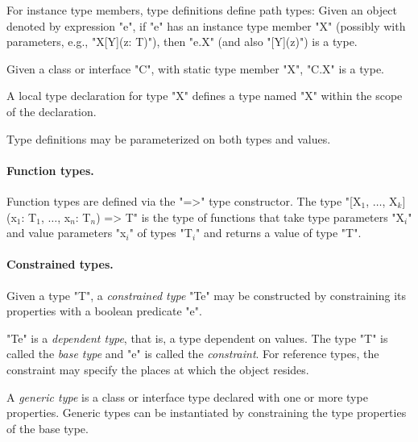 
        For instance type members, type definitions define path
        types: Given an object
        denoted by expression \xcd"e", if \xcd"e" has an
        instance
        type member \xcd"X" (possibly with parameters, e.g.,
        \xcd"X[Y](z: T)"), then \xcd"e.X" (and also \xcd"[Y](z)")
        is a type.

        Given a class or interface \xcd"C", with static type
        member \xcd"X", \xcd"C.X" is a type.

        A local type declaration for type \xcd"X" defines a type
        named \xcd"X" within the scope of the declaration.

        Type definitions may be parameterized on both types and
        values.

\paragraph{Function types.}

        Function types are defined via the \xcd"=>" type
        constructor.  The type
  \xcdmath"[X$_1$, $\dots$, X$_k$](x$_1$: T$_1$, $\dots$, x$_n$: T$_n$) => T"
        is the type of functions that take type parameters
        \xcdmath"X$_i$"
        and value parameters
        \xcdmath"x$_i$"
        of types
        \xcdmath"T$_i$"
        and returns a value of type \xcd"T".

\paragraph{Constrained types.}
        Given a type \xcd"T", a {\em constrained type}
        \xcd"T{e}" may be
        constructed by constraining its properties with a
        boolean predicate \xcd"e".

        \xcd"T{e}" is a {\em dependent type}, that is, a type
        dependent on values.
        The type \xcd"T" is called the
        {\em base type} and \xcd"e" is called the {\em constraint}.
        For reference types, the constraint may
        specify the places at which the object resides.

        A {\em generic type} is a class or interface type
        declared with one or more type properties.  Generic
        types can be instantiated by constraining the type
        properties of the base type.




